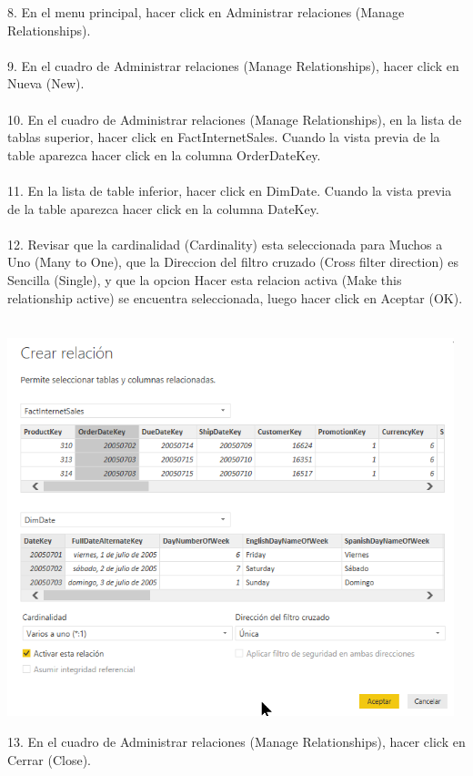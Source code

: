 \documentclass[12pt,letterpaper]{article}
\begin{document}
8. En el menu principal, hacer click en Administrar relaciones (Manage Relationships).\\\\ 
9. En el cuadro de Administrar relaciones (Manage Relationships), hacer click en Nueva (New).\\\\ 
10. En el cuadro de Administrar relaciones (Manage Relationships), en la lista de tablas superior, hacer click en FactInternetSales. Cuando la vista previa de la table aparezca hacer click en la columna OrderDateKey.\\\\ 
11. En la lista de table inferior, hacer click en DimDate. Cuando la vista previa de la table aparezca hacer click en la columna DateKey.\\\\ 
12. Revisar que la cardinalidad (Cardinality) esta seleccionada para Muchos a Uno (Many to One), que la Direccion del filtro cruzado (Cross filter direction) es Sencilla (Single), y que la opcion Hacer esta relacion activa (Make this relationship active) se encuentra seleccionada, luego hacer click en Aceptar (OK).\\\\ 
\begin{center}
\includegraphics[width=13cm]{IMG/4.png} 
\end{center}
13. En el cuadro de Administrar relaciones (Manage Relationships), hacer click en Cerrar (Close).\\\\ 
\end{document}
